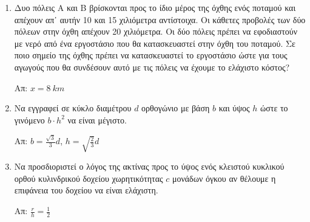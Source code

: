 \begin{enumerate}
	\item Δυο πόλεις Α και Β βρίσκονται προς το ίδιο μέρος της όχθης ενός
		ποταμού και απέχουν απ᾽ αυτήν 10 και 15 χιλιόμετρα αντίστοιχα. Οι
		κάθετες προβολές των δύο πόλεων στην όχθη απέχουν 20 χιλιόμετρα. Οι δύο
		πόλεις πρέπει να εφοδιαστούν με νερό από ένα εργοστάσιο που θα
		κατασκευαστεί στην όχθη του ποταμού. Σε ποιο σημείο της όχθης πρέπει να
		κατασκευαστεί το εργοστάσιο ώστε για τους αγωγούς που θα συνδέσουν αυτό
		με τις πόλεις να έχουμε το ελάχιστο κόστος?

		\hfill Απ: $ x = \SI{8}{km} $

	\item Να εγγραφεί σε κύκλο διαμέτρου $d$ ορθογώνιο με βάση $b$ και ύψος $h$
		ώστε το γινόμενο $ b\cdot h^{2} $ να είναι μέγιστο.

		\hfill Απ: $b = \frac{\sqrt{3}}{3} d$, $ h = \sqrt{\frac{2}{3}
		} d $

	\item Να προσδιοριστεί ο λόγος της ακτίνας προς το ύψος ενός κλειστού
		κυκλικού ορθού κυλινδρικού δοχείου χωρητικότητας $c$ μονάδων όγκου αν
		θέλουμε η επιφάνεια του δοχείου να είναι ελάχιστη.

		\hfill Απ: $\frac{r}{h} = \frac{1}{2} $
		
\end{enumerate}



